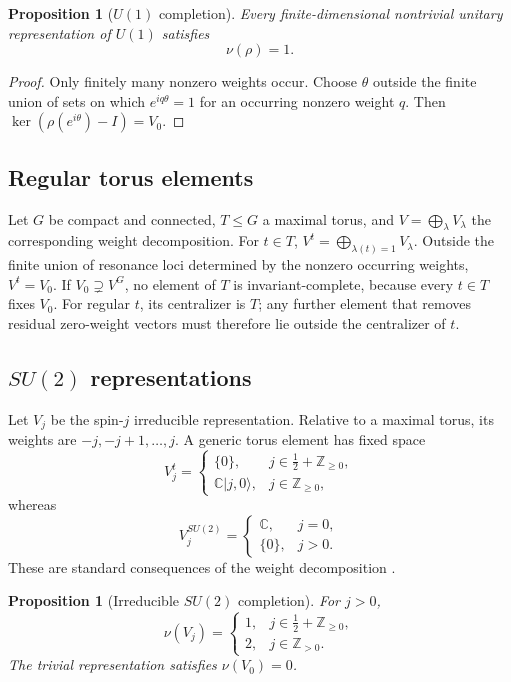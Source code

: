 \documentclass[11pt]{article}
\theoremstyle{plain}
\newtheorem{proposition}[theorem]{Proposition}
\theoremstyle{definition}
\begin{document}
\begin{proposition}[\texorpdfstring{\(U(1)\)}{U(1)} completion]
\label{prop:U1-completion}
Every finite-dimensional nontrivial unitary representation of \(U(1)\) satisfies
\[
\nu(\rho)=1.
\]
\end{proposition}

\begin{proof}
Only finitely many nonzero weights occur. Choose \(\theta\) outside the finite union of sets on which \(e^{iq\theta}=1\) for an occurring nonzero weight \(q\). Then
\(\ker(\rho(e^{i\theta})-I)=V_0\).
\end{proof}

\subsection{Regular torus elements}

Let \(G\) be compact and connected, \(T\leq G\) a maximal torus, and \(V=\bigoplus_\lambda V_\lambda\) the corresponding weight decomposition. For \(t\in T\),
\(V^t = \bigoplus_{\lambda(t)=1}V_\lambda\).
Outside the finite union of resonance loci determined by the nonzero occurring weights,
\(V^t=V_0\).
If
\(V_0\supsetneq V^G\),
no element of \(T\) is invariant-complete, because every \(t\in T\) fixes
\(V_0\). For regular \(t\), its centralizer is \(T\); any further element
that removes residual zero-weight vectors must therefore lie outside the
centralizer of \(t\).

\subsection{\texorpdfstring{\(SU(2)\)}{SU(2)} representations}

Let \(V_j\) be the spin-\(j\) irreducible representation. Relative to a maximal torus, its weights are
\(-j,-j+1,\ldots,j\).
A generic torus element has fixed space
\[
V_j^t
=
\begin{cases}
\{0\}, & j\in\frac12+\mathbb Z_{\geq0},\\[1mm]
\mathbb C|j,0\rangle, & j\in\mathbb Z_{\geq0},
\end{cases}
\]
whereas
\[
V_j^{SU(2)}
=
\begin{cases}
\mathbb C, & j=0,\\
\{0\}, & j>0.
\end{cases}
\]
These are standard consequences of the weight decomposition
\citep{Hall2015,BrockerTomDieck1985}.

\begin{proposition}[Irreducible \texorpdfstring{\(SU(2)\)}{SU(2)} completion]
\label{prop:SU2-irrep-completion}
For \(j>0\),
\[
\nu(V_j)
=
\begin{cases}
1, & j\in\frac12+\mathbb Z_{\geq0},\\
2, & j\in\mathbb Z_{>0}.
\end{cases}
\]
The trivial representation satisfies \(\nu(V_0)=0\).
\end{proposition}
\end{document}
